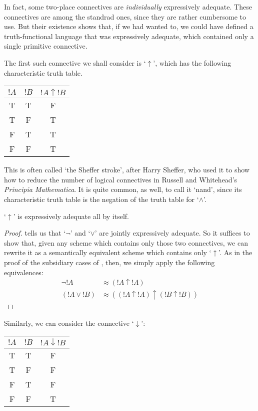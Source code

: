 \documentclass[../../../include/open-logic-section]{subfiles}
\begin{document}
In fact, some two-place connectives are \emph{individually} expressively adequate. These connectives are among the standrad ones, since they are rather cumbersome to use. But their existence shows that, if we had wanted to, we could have defined a truth-functional language that was expressively adequate, which contained only a single primitive connective.

The first such connective we shall consider is `$\uparrow$', which has the following characteristic truth table. 
\begin{center}
\begin{tabular}{c c | c}
${!A}$ & ${!B}$ & ${!A} \mathrel{\uparrow} {!B}$\\
\hline
 T & T & F \\
 T & F & T \\
 F & T & T  \\
 F & F & T
\end{tabular}
\end{center}
 This is often called `the Sheffer stroke', after Harry Sheffer, who used it to show how to reduce the number of logical connectives in Russell and Whitehead's \emph{Principia Mathematica}. It is quite common, as well, to call it `nand', since its characteristic truth table is the negation of the truth table for `$\land$'.
\begin{prop}`$\uparrow$' is expressively adequate all by itself. 
	\begin{proof}
		 tells us that `$\lnot$' and `$\lor$' are jointly expressively adequate. So it suffices to show that, given any scheme which contains only those two connectives, we can rewrite it as a semantically equivalent scheme which contains only `$\uparrow$'. As in the proof of the subsidiary cases of , then, we simply apply the following equivalences:
		\begin{align*}
			\lnot {!A} &\approx ({!A} \uparrow {!A})\\
			({!A} \lor {!B}) & \approx (({!A} \uparrow {!A}) \uparrow ({!B} \uparrow {!B}))
		\end{align*}
	\end{proof}
\end{prop}\noindent
Similarly, we can consider the connective `$\downarrow$':
\begin{center}
\begin{tabular}{c c | c}
${!A}$ & ${!B}$ & ${!A} \mathrel{\downarrow} {!B}$\\
\hline
 T & T & F \\
 T & F & F  \\
 F & T & F  \\
 F & F & T
\end{tabular}
\end{center}
\end{document}
